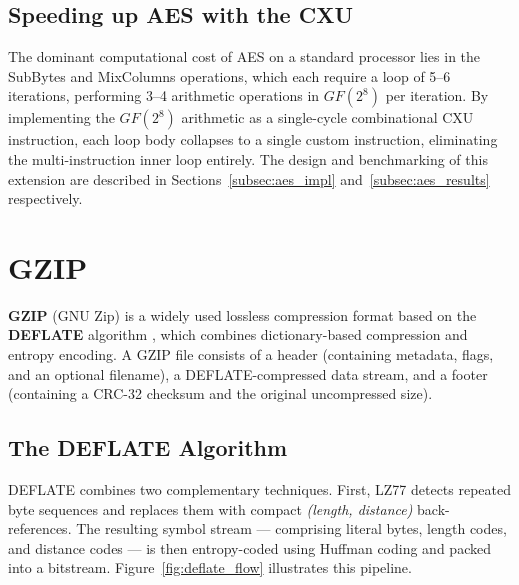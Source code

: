 \subsection{Speeding up AES with the CXU}
\label{subsec:aes_cxu}

The dominant computational cost of AES on a standard processor lies in the SubBytes
and MixColumns operations, which each require a loop of 5--6 iterations, performing
3--4 arithmetic operations in $GF(2^8)$ per iteration.
By implementing the $GF(2^8)$ arithmetic as a single-cycle combinational CXU
instruction, each loop body collapses to a single custom instruction, eliminating the
multi-instruction inner loop entirely.
The design and benchmarking of this extension are described in
Sections~\ref{subsec:aes_impl} and~\ref{subsec:aes_results} respectively.

\section{GZIP}
\label{sec:gzip}

\textbf{GZIP} (GNU Zip) \cite{GZIPWebsite} is a widely used lossless compression
format based on the \textbf{DEFLATE} algorithm \cite{DEFLATESpec}, which combines
dictionary-based compression and entropy encoding.
A GZIP file consists of a header (containing metadata, flags, and an optional
filename), a DEFLATE-compressed data stream, and a footer (containing a CRC-32
checksum and the original uncompressed size).

\subsection{The DEFLATE Algorithm}
\label{subsec:deflate}

DEFLATE combines two complementary techniques.
First, LZ77 detects repeated byte sequences and replaces them with compact
\textit{(length, distance)} back-references.
The resulting symbol stream --- comprising literal bytes, length codes, and distance
codes --- is then entropy-coded using Huffman coding and packed into a bitstream.
Figure~\ref{fig:deflate_flow} illustrates this pipeline.

